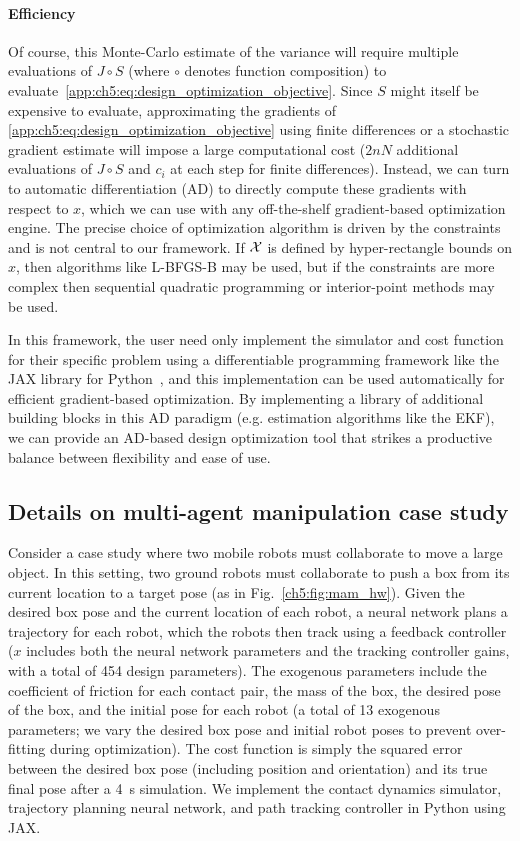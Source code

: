 \paragraph{Efficiency} Of course, this Monte-Carlo estimate of the variance will require multiple evaluations of $J\circ S$ (where $\circ$ denotes function composition) to evaluate~\eqref{app:ch5:eq:design_optimization_objective}. Since $S$ might itself be expensive to evaluate, approximating the gradients of \eqref{app:ch5:eq:design_optimization_objective} using finite differences or a stochastic gradient estimate will impose a large computational cost ($2nN$ additional evaluations of $J\circ S$ and $c_i$ at each step for finite differences). Instead, we can turn to automatic differentiation (AD) to directly compute these gradients with respect to $x$, which we can use with any off-the-shelf gradient-based optimization engine. The precise choice of optimization algorithm is driven by the constraints and is not central to our framework. If $\mathcal{X}$ is defined by hyper-rectangle bounds on $x$, then algorithms like L-BFGS-B may be used, but if the constraints are more complex then sequential quadratic programming or interior-point methods may be used.

In this framework, the user need only implement the simulator and cost function for their specific problem using a differentiable programming framework like the JAX library for Python~\cite{jax2018github}, and this implementation can be used automatically for efficient gradient-based optimization. By implementing a library of additional building blocks in this AD paradigm (e.g. estimation algorithms like the EKF), we can provide an AD-based design optimization tool that strikes a productive balance between flexibility and ease of use.

\subsection{Details on multi-agent manipulation case study}

Consider a case study where two mobile robots must collaborate to move a large object. In this setting, two ground robots must collaborate to push a box from its current location to a target pose (as in Fig.~\ref{ch5:fig:mam_hw}). Given the desired box pose and the current location of each robot, a neural network plans a trajectory for each robot, which the robots then track using a feedback controller ($x$ includes both the neural network parameters and the tracking controller gains, with a total of 454 design parameters). The exogenous parameters include the coefficient of friction for each contact pair, the mass of the box, the desired pose of the box, and the initial pose for each robot (a total of 13 exogenous parameters; we vary the desired box pose and initial robot poses to prevent over-fitting during optimization). The cost function is simply the squared error between the desired box pose (including position and orientation) and its true final pose after a \SI{4}{s} simulation. We implement the contact dynamics simulator, trajectory planning neural network, and path tracking controller in Python using JAX.

